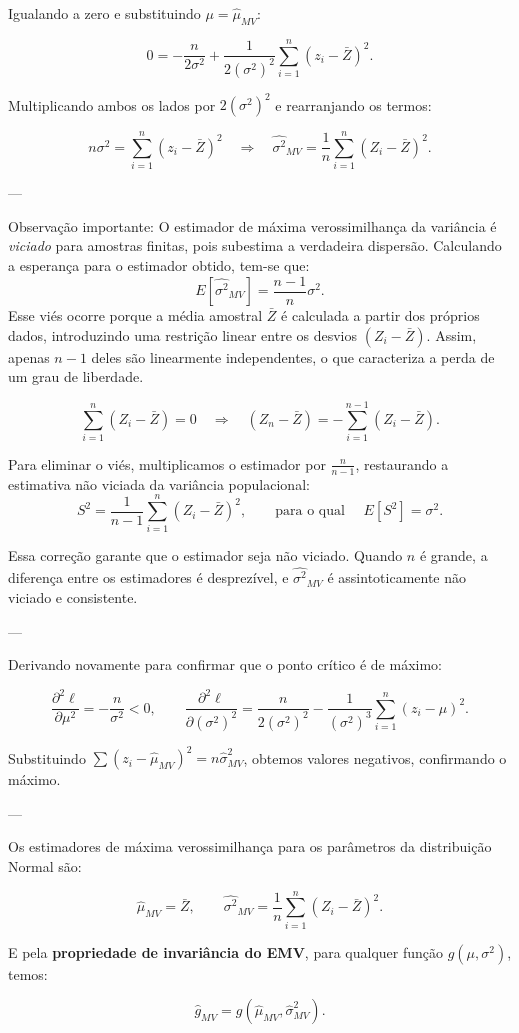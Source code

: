 Igualando a zero e substituindo $\mu = \widehat{\mu}_{MV}$:

\[
0 = -\frac{n}{2\sigma^2}
+ \frac{1}{2(\sigma^2)^2}\sum_{i=1}^n (z_i-\bar{Z})^2.
\]

Multiplicando ambos os lados por $2(\sigma^2)^2$ e rearranjando os termos:

\[
n\sigma^2 = \sum_{i=1}^n (z_i-\bar{Z})^2
\quad\Longrightarrow\quad
\boxed{
\widehat{\sigma^2}_{MV} = \frac{1}{n}\sum_{i=1}^n (Z_i - \bar{Z})^2.
}
\]

---

\noindent
Observação importante: O estimador de máxima verossimilhança da variância é \textit{viciado} para amostras finitas, pois subestima a verdadeira dispersão.  
Calculando a esperança para o estimador obtido, tem-se que:
\[
E[\widehat{\sigma^2}_{MV}] = \frac{n-1}{n}\sigma^2.
\]
Esse viés ocorre porque a média amostral $\bar{Z}$ é calculada a partir dos próprios dados, introduzindo uma restrição linear entre os desvios $(Z_i - \bar{Z})$.  
Assim, apenas $n - 1$ deles são linearmente independentes, o que caracteriza a perda de um grau de liberdade.

\[
\sum_{i=1}^{n}(Z_i - \bar{Z}) = 0 \quad \Longrightarrow \quad (Z_n - \bar{Z}) = -\sum_{i=1}^{n-1}(Z_i - \bar{Z}).
\]

Para eliminar o viés, multiplicamos o estimador por $\tfrac{n}{n-1}$,  
restaurando a estimativa não viciada da variância populacional:
\[
S^2 = \frac{1}{n-1}\sum_{i=1}^{n}(Z_i - \bar{Z})^2, 
\qquad \text{para o qual } \quad E[S^2] = \sigma^2.
\]

Essa correção garante que o estimador seja não viciado.  
Quando $n$ é grande, a diferença entre os estimadores é desprezível,  
e $\widehat{\sigma^2}_{MV}$ é assintoticamente não viciado e consistente.

---

Derivando novamente para confirmar que o ponto crítico é de máximo:

\[
\frac{\partial^2 \ell}{\partial \mu^2} = -\frac{n}{\sigma^2} < 0,
\qquad
\frac{\partial^2 \ell}{\partial(\sigma^2)^2}
= \frac{n}{2(\sigma^2)^2} - \frac{1}{(\sigma^2)^3}\sum_{i=1}^n (z_i-\mu)^2.
\]

Substituindo $\sum (z_i-\widehat\mu_{MV})^2 = n\widehat\sigma^2_{MV}$, obtemos valores negativos, confirmando o máximo.

---
 
Os estimadores de máxima verossimilhança para os parâmetros da distribuição Normal são:

\[
\boxed{
\widehat\mu_{MV} = \bar{Z},
\qquad
\widehat{\sigma^2}_{MV} = \frac{1}{n}\sum_{i=1}^n (Z_i - \bar{Z})^2.
}
\]

E pela \textbf{propriedade de invariância do EMV}, para qualquer função $g(\mu,\sigma^2)$, temos:

\[
\boxed{
\widehat{g}_{MV} = g(\widehat\mu_{MV}, \widehat\sigma^2_{MV}).
}
\]